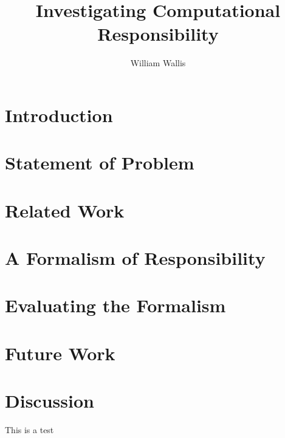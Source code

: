 



\title{Investigating Computational Responsibility}
\author{William Wallis}

\maketitle

\section{Introduction}


\section{Statement of Problem}


\section{Related Work}


\section{A Formalism of Responsibility}


\section{Evaluating the Formalism}


\section{Future Work}


\section{Discussion}

This is a test\cite{testcite}





